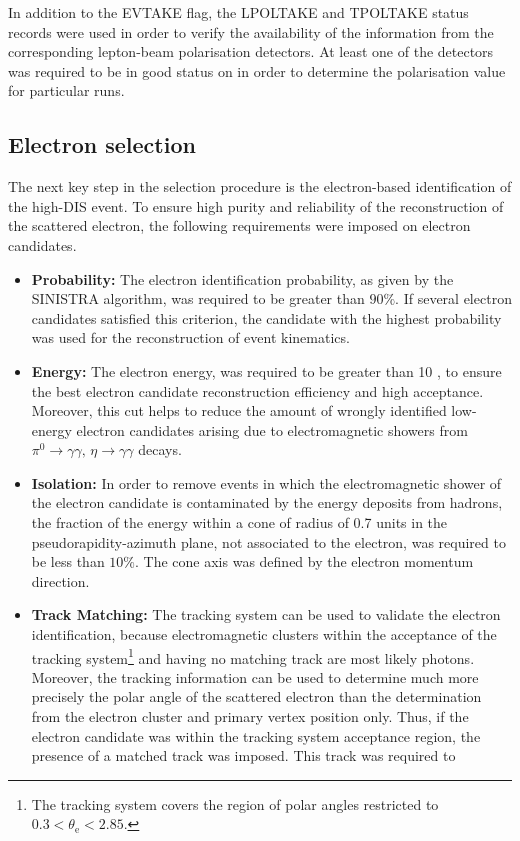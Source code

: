 In addition to the EVTAKE flag, the LPOLTAKE and TPOLTAKE status records were used in order to verify the availability of the information from the corresponding lepton-beam polarisation detectors. At least one of the detectors was required to be in good status on in order to determine the polarisation value for particular runs.

\subsection{Electron selection}
\label{subsec:eleselect}
The next key step in the selection procedure is the electron-based identification of the high-\qsq DIS event. To ensure high purity and reliability of the reconstruction of the scattered electron, the following requirements were imposed on electron candidates.
\begin{itemize}
	\item \textbf{Probability:} The electron identification probability, as given by the SINISTRA algorithm, was required to be greater than $90\%$. If several electron candidates satisfied this criterion, the candidate with the highest probability was used for the reconstruction of event kinematics.
	\item \textbf{Energy:} The electron energy, \eefin was required to be greater than 10 \GeV, to ensure the best electron candidate reconstruction efficiency and high acceptance. Moreover, this cut helps to reduce the amount of wrongly identified low-energy electron candidates arising due to electromagnetic showers from $\pi^0\rightarrow\gamma\gamma,\, \eta\rightarrow\gamma\gamma$ decays.
	\item \textbf{Isolation:} In order to remove events in which the electromagnetic shower of the electron candidate is contaminated by the energy deposits from hadrons, the fraction of the energy within a cone of radius of 0.7 units in the pseudorapidity-azimuth plane, not associated to the electron, was required to be less than $10\%$. The cone axis was defined by the electron momentum direction.
	\item \textbf{Track Matching:} The tracking system can be used to validate the electron identification, because electromagnetic clusters within the acceptance of the tracking system\footnote{The tracking system covers the region of polar angles restricted to $0.3 < \theta_\text{e} < 2.85$.} and having no matching track are most likely photons. Moreover, the tracking information can be used to determine much more precisely the polar angle of the scattered electron than the determination from the electron cluster and primary vertex position only. Thus, if the electron candidate was within the tracking system acceptance region, the presence of a matched track was imposed. This track was required to 

\end{itemize}
